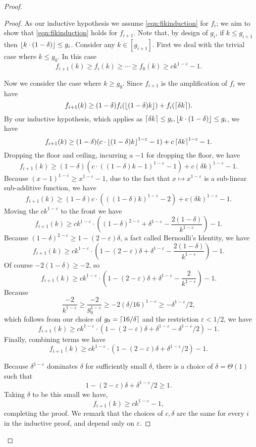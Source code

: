 \begin{proof}
\begin{proof}
  As our inductive hypothesis we assume
  \eqref{eqn:fikinduction} for $f_i$; we aim to show that 
  \eqref{eqn:fikinduction} holds for $f_{i+1}$. Note that, by
  design of $g_i$, if $k \le g_{i+1}$ then $\left\lfloor k\cdot (1-\delta) \right\rfloor \le g_i$.
  Consider any $k\in [g_{i+1}]$. First we deal with the trivial
  case where $k \le g_0$. In this case 
  $$f_{i+1}(k) \ge f_i(k) \ge \cdots \ge f_0(k) \ge ck^{1-\varepsilon} -1.$$

  Now we consider the case where $k \ge g_0$.
  Since $f_{i+1}$ is the amplification of $f_i$ we have
  $$f_{i+1}(k) \ge (1-\delta) f_i(\left\lfloor (1-\delta)k \right\rfloor) + f_i(\left\lceil \delta k \right\rceil).$$
  By our inductive hypothesis, which applies as $\left\lceil \delta k \right\rceil\le g_i, \left\lfloor k\cdot (1-\delta) \right\rfloor \le g_i$, we have
  $$f_{i+1}(k) \ge (1-\delta) (c \cdot\left\lfloor (1-\delta)k \right\rfloor^{1-\varepsilon}-1) + c\left\lceil \delta k \right\rceil^{1-\varepsilon} - 1. $$
  Dropping the floor and ceiling, incurring a $-1$ for dropping the floor, we have
  $$f_{i+1}(k) \ge (1-\delta) (c \cdot ((1-\delta)k-1)^{1-\varepsilon}-1) + c (\delta k)^{1-\varepsilon} - 1.$$
  Because $(x-1)^{1-\varepsilon} \ge x^{1-\varepsilon} -1$, due to the
  fact that $x\mapsto x^{1-\varepsilon}$ is a sub-linear
  sub-additive function, we have 
  $$f_{i+1}(k) \ge (1-\delta) c \cdot (((1-\delta)k)^{1-\varepsilon}-2) + c(\delta k)^{1-\varepsilon}-1.$$
  Moving the $ck^{1-\varepsilon}$ to the front we have
  $$ f_{i+1}(k) \ge ck^{1-\varepsilon} \cdot\left((1-\delta)^{2-\varepsilon} + \delta^{1-\varepsilon} - \frac{2(1-\delta)}{k^{1-\varepsilon}} \right) -1.$$
  Because $(1-\delta)^{2-\varepsilon} \ge 1-(2-\varepsilon)\delta$, a fact called Bernoulli's Identity, we have
  $$f_{i+1}(k) \ge ck^{1-\varepsilon} \cdot\left(1-(2-\varepsilon)\delta + \delta^{1-\varepsilon} - \frac{2(1-\delta)}{k^{1-\varepsilon}} \right)-1.$$
  Of course $-2(1-\delta) \ge -2$, so 
  $$f_{i+1}(k) \ge ck^{1-\varepsilon} \cdot\left(1-(2-\varepsilon)\delta + \delta^{1-\varepsilon} - \frac{2}{k^{1-\varepsilon}} \right) -1.$$
  Because 
  $$\frac{-2}{k^{1-\varepsilon}} \ge \frac{-2}{g_0^{1-\varepsilon}} \ge -2(\delta/16)^{1-\varepsilon} \ge -\delta^{1-\varepsilon}/2,$$ 
  which follows from our choice of $g_0 = \left\lceil 16/\delta \right\rceil$ and the restriction
  $\varepsilon<1/2$, we have
  $$f_{i+1}(k) \ge ck^{1-\varepsilon}
  \cdot\left(1-(2-\varepsilon)\delta + \delta^{1-\varepsilon} - \delta^{1-\varepsilon}/2 \right)-1.$$
  Finally, combining terms we have
  $$f_{i+1}(k) \ge  ck^{1-\varepsilon} \cdot\left(1-(2-\varepsilon)\delta + \delta^{1-\varepsilon}/2\right)-1. $$

  Because $\delta^{1-\varepsilon}$ dominates $\delta$ for
  sufficiently small $\delta$, there is a choice of
  $\delta=\Theta(1)$ such that 
  $$1-(2-\varepsilon)\delta + \delta^{1-\varepsilon}/2 \ge 1.$$ 
  Taking $\delta$ to be this
  small we have,
  $$f_{i+1}(k) \ge ck^{1-\varepsilon}-1,$$
  completing the proof. We remark that the choices of $c, \delta$
  are the same for every $i$ in the inductive proof, and depend
  only on $\varepsilon$. 
  \end{proof}


\end{proof}
